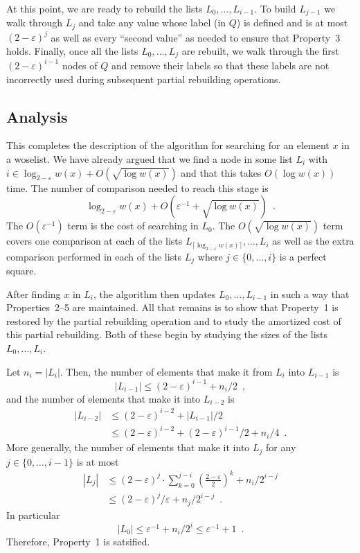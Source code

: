 \documentclass[lotsofwhite]{patmorin}
\newcommand{\eps}{\varepsilon}
\begin{document}
At this point, we are ready to rebuild the lists $L_0,\ldots,L_{i-1}$. To
build $L_{j-1}$ we walk through $L_j$ and take any value whose label
(in $Q$) is defined and is at most $(2-\eps)^j$ as well as every
``second value'' as needed to ensure that Property~3 holds.  Finally,
once all the lists $L_0,\ldots,L_j$ are rebuilt, we walk through the first
$(2-\eps)^{i-1}$ nodes of $Q$ and remove their labels so that these labels
are not incorrectly used during subsequent partial rebuilding operations.

\subsection{Analysis}

This completes the description of the algorithm for searching for an
element $x$ in a woselist.  We have already argued that we find a node
in some list $L_i$ with $i\in \log_{2-\eps} w(x) + O(\sqrt{\log w(x)})$
and that this takes $O(\log w(x))$ time.  The number of comparison needed
to reach this stage is
\[
     \log_{2-\eps} w(x) + O(\eps^{-1} + \sqrt{\log w(x)}) \enspace .
\]
The $O(\eps^{-1})$ term is the cost of searching in $L_0$. The 
$O(\sqrt{\log w(x)})$ term covers one comparison at each of the lists
$L_{\lceil\log_{2-\eps} w(x)\rceil},\ldots,L_i$ as well as the extra
comparison performed in each of the lists $L_j$ where $j\in\{0,\ldots,i\}$
is a perfect square.

After finding $x$ in $L_i$, the algorithm then updates
$L_0,\ldots,L_{i-1}$ in such a way that Properties~2--5 are maintained.
All that remains is to show that Property~1 is restored by the partial
rebuilding operation and to study the amortized cost of this partial
rebuilding.  Both of these begin by studying the sizes of the lists
$L_0,\ldots,L_i$.

Let $n_i=|L_i|$. Then,
the number of elements that make it from $L_i$ into $L_{i-1}$ is 
\[  |L_{i-1}| \le (2-\eps)^{i-1} + n_i/2 \enspace , \]
and the number of elements that make it into $L_{i-2}$ is
\begin{align*}
   |L_{i-2}| & \le (2-\eps)^{i-2} + |L_{i-1}|/2 \\
     & \le (2-\eps)^{i-2} + (2-\eps)^{i-1}/2 + n_i/4 \enspace . 
\end{align*}
More generally, the number of elements that make it into $L_j$ for any $j\in \{0,\ldots,i-1\}$ is at most
\begin{align*}
    |L_j| & \le (2-\eps)^{j} \cdot \sum_{k=0}^{j-i}\left(\frac{2-\eps}{2}\right)^k  + n_i/2^{i-j} \\
       & \le (2-\eps)^j/\eps + n_j/2^{i-j} \enspace .
\end{align*}
In particular
\[
    |L_0| \le \eps^{-1} + n_i/2^i \le \eps^{-1} + 1\enspace .
\]
Therefore, Property~1 is satsified.
\end{document}
